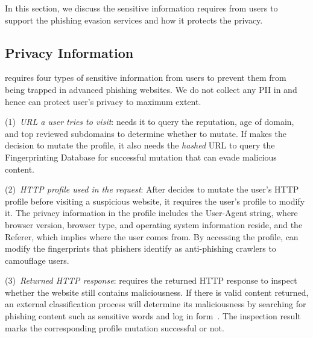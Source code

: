 In this section, we discuss the sensitive information \spartacus requires from users to support the phishing evasion services and how it protects the privacy.

\subsection{Privacy Information}

\spartacus requires four types of sensitive information from users to prevent them from being trapped in advanced phishing websites.
We do not collect any PII in \spartacus and hence can protect user's privacy to maximum extent.

(1)~\emph{URL a user tries to visit}: \spartacus needs it to query the reputation, age of domain, and top reviewed subdomains to determine whether to mutate.
If \spartacus makes the decision to mutate the profile, it also needs the \emph{hashed} URL to query the Fingerprinting Database for successful mutation that can evade malicious content.

(2)~\emph{HTTP profile used in the request}:
After \spartacus decides to mutate the user's HTTP profile before visiting a suspicious website, it requires the user's profile to modify it.
The privacy information in the profile includes the User-Agent string, where browser version, browser type, and operating system information reside, and the Referer, which implies where the user comes from.
By accessing the profile, \spartacus can modify the fingerprints that phishers identify as anti-phishing crawlers to camouflage users.

(3)~\emph{Returned HTTP response}:
\spartacus requires the returned HTTP response to inspect whether the website still contains maliciousness.
If there is valid content returned,
an external classification process will determine its maliciousness by searching for phishing content such as sensitive words and log in form~\cite{xiang2011cantina+}.
The inspection result marks the corresponding profile mutation successful or not.


